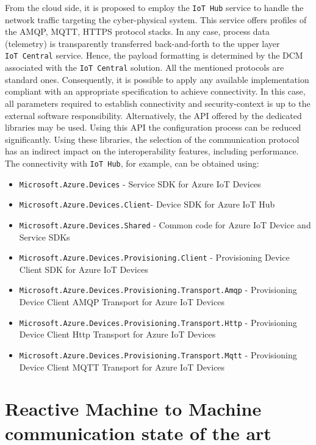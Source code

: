 \documentclass[
]{article}
\providecommand{\tightlist}{%
  \setlength{\itemsep}{0pt}\setlength{\parskip}{0pt}}
\begin{document}
From the cloud side, it is proposed to employ the \texttt{IoT\ Hub}
service to handle the network traffic targeting the cyber-physical
system. This service offers profiles of the AMQP, MQTT, HTTPS protocol
stacks. In any case, process data (telemetry) is transparently
transferred back-and-forth to the upper layer \texttt{IoT\ Central}
service. Hence, the payload formatting is determined by the DCM
associated with the \texttt{IoT\ Central} solution. All the mentioned
protocols are standard ones. Consequently, it is possible to apply any
available implementation compliant with an appropriate specification to
achieve connectivity. In this case, all parameters required to establish
connectivity and security-context is up to the external software
responsibility. Alternatively, the API offered by the dedicated
libraries may be used. Using this API the configuration process can be
reduced significantly. Using these libraries, the selection of the
communication protocol has an indirect impact on the interoperability
features, including performance. The connectivity with
\texttt{IoT\ Hub}, for example, can be obtained using:

\begin{itemize}
\tightlist
\item
  \texttt{Microsoft.Azure.Devices} - Service SDK for Azure IoT Devices
\item
  \texttt{Microsoft.Azure.Devices.Client}- Device SDK for Azure IoT Hub
\item
  \texttt{Microsoft.Azure.Devices.Shared} - Common code for Azure IoT
  Device and Service SDKs
\item
  \texttt{Microsoft.Azure.Devices.Provisioning.Client} - Provisioning
  Device Client SDK for Azure IoT Devices
\item
  \texttt{Microsoft.Azure.Devices.Provisioning.Transport.Amqp} -
  Provisioning Device Client AMQP Transport for Azure IoT Devices
\item
  \texttt{Microsoft.Azure.Devices.Provisioning.Transport.Http} -
  Provisioning Device Client Http Transport for Azure IoT Devices
\item
  \texttt{Microsoft.Azure.Devices.Provisioning.Transport.Mqtt} -
  Provisioning Device Client MQTT Transport for Azure IoT Devices
\end{itemize}

\hypertarget{reactive-machine-to-machine-communication-state-of-the-art}{%
\section{Reactive Machine to Machine communication state of the
art}\label{reactive-machine-to-machine-communication-state-of-the-art}}
\end{document}
